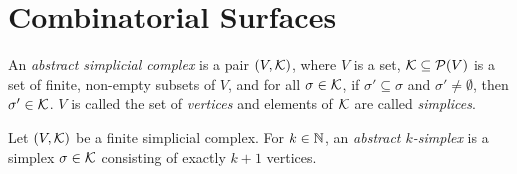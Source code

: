 \chapter{Combinatorial Surfaces}
\label{chap:combo_surfaces}



\begin{definition}
  \label{def:abstract_simplicial_complex}
  \leanok
  An \emph{abstract simplicial complex} is a pair $(V,\mathcal{K})$, 
  where $V$ is a set, 
  $\mathcal{K} \subseteq \mathcal{P}(V)$ is a set of finite, non-empty subsets of $V$, 
  and for all $\sigma \in \mathcal{K}$, 
  if $\sigma' \subseteq \sigma$ and $\sigma' \neq \emptyset$, 
  then $\sigma' \in \mathcal{K}$. 
  $V$ is called the set of \emph{vertices} 
  and elements of $\mathcal{K}$ are called \emph{simplices}.
\end{definition}

\begin{definition}
  \label{def:abstract_simplex}
  \leanok
  Let $(V,\mathcal{K})$ be a finite simplicial complex. 
  For $k \in \mathbb{N}$, an \emph{abstract $k$-simplex} is 
  a simplex $\sigma \in \mathcal{K}$ consisting of exactly $k+1$ vertices.
\end{definition}
